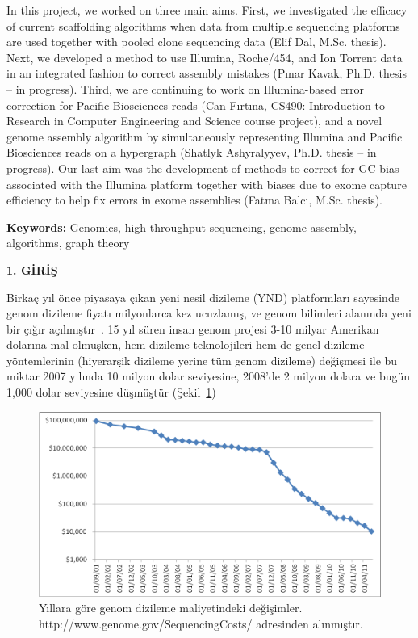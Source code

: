 \documentclass[11pt]{article}
\begin{document}
In this project, we worked on three main aims. First, 
we investigated the efficacy  of current scaffolding algorithms when data from multiple sequencing platforms are used together with pooled clone sequencing data (Elif Dal, M.Sc. thesis). 
Next, we developed a method to use Illumina, Roche/454, and Ion Torrent data in an integrated fashion to correct assembly mistakes (Pınar Kavak, Ph.D. thesis -- in progress).
Third, we are continuing to work on Illumina-based error correction for Pacific Biosciences reads (Can Fırtına, CS490:  Introduction to Research in Computer Engineering and Science course project), and a novel genome assembly algorithm by simultaneously representing Illumina and Pacific Biosciences reads on a hypergraph (Shatlyk Ashyralyyev, Ph.D. thesis -- in progress). Our last aim was the development of methods to correct for GC bias associated with the Illumina platform together with biases due to exome capture efficiency to help fix errors in exome assemblies (Fatma Balcı, M.Sc. thesis). 

{\bf Keywords:} Genomics, high throughput sequencing, genome assembly, algorithms, graph theory


\newpage
{}
\setcounter{page}{1}

\begin{center}
{\bf \Large 1. GİRİŞ}
\end{center}

\bigskip
\noindent

Birkaç yıl önce piyasaya çıkan yeni nesil dizileme (YND) platformları sayesinde genom dizileme fiyatı milyonlarca kez ucuzlamış, ve genom bilimleri alanında yeni bir çığır açılmıştır~\cite{Mardis2008}. 15 yıl süren insan genom projesi 3-10 milyar Amerikan dolarına mal olmuşken, hem dizileme teknolojileri hem de genel dizileme yöntemlerinin (hiyerarşik dizileme yerine tüm genom dizileme) değişmesi ile bu miktar 2007 yılında 10 milyon dolar seviyesine, 2008'de 2 milyon dolara ve bugün 1,000 dolar seviyesine düşmüştür (Şekil~\ref{fig:cost})

\begin{figure}[htb]
\begin{center}
  \includegraphics[scale=0.75]{cost.png}
\end{center}
\caption{Yıllara göre genom dizileme maliyetindeki değişimler. http://www.genome.gov/SequencingCosts/ adresinden alınmıştır.}
\label{fig:cost}
\end{figure}
\end{document}
